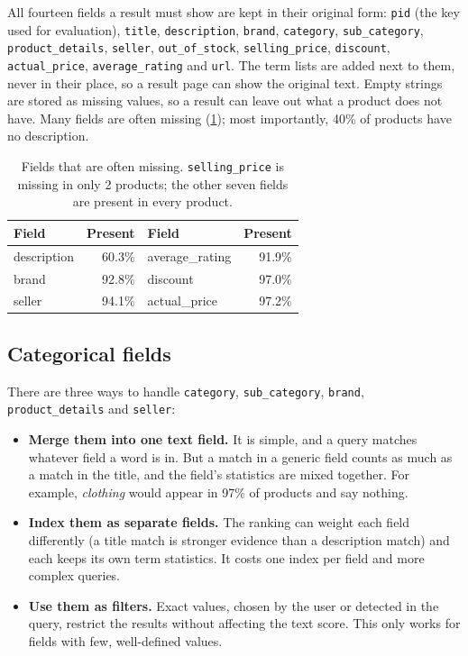 \documentclass[11pt,a4paper]{article}
\begin{document}
All fourteen fields a result must show are kept in their original form: \texttt{pid}
(the key used for evaluation), \texttt{title}, \texttt{description}, \texttt{brand},
\texttt{category}, \texttt{sub\_category}, \texttt{product\_details}, \texttt{seller},
\texttt{out\_of\_stock}, \texttt{selling\_price}, \texttt{discount},
\texttt{actual\_price}, \texttt{average\_rating} and \texttt{url}. The term lists are
added next to them, never in their place, so a result page can show the original
text. Empty strings are stored as missing values, so a result can leave out what a
product does not have. Many fields are often missing
(\cref{tab:presence}); most importantly, 40\% of products have no description.

\begin{table}[htbp]
  \centering
  \begin{tabular}{lr@{\hskip 2em}lr}
    \toprule
    Field & Present & Field & Present \\
    \midrule
    description & 60.3\% & average\_rating & 91.9\% \\
    brand & 92.8\% & discount & 97.0\% \\
    seller & 94.1\% & actual\_price & 97.2\% \\
    \bottomrule
  \end{tabular}
  \caption{Fields that are often missing. \texttt{selling\_price} is missing in only
    2 products; the other seven fields are present in every product.}
  \label{tab:presence}
\end{table}

\subsection{Categorical fields}

There are three ways to handle \texttt{category}, \texttt{sub\_category},
\texttt{brand}, \texttt{product\_details} and \texttt{seller}:

\begin{itemize}
  \item \textbf{Merge them into one text field.} It is simple, and a query matches
    whatever field a word is in. But a match in a generic field counts as much as a
    match in the title, and the field's statistics are mixed together. For example,
    \emph{clothing} would appear in 97\% of products and say nothing.
  \item \textbf{Index them as separate fields.} The ranking can weight each field
    differently (a title match is stronger evidence than a description match) and
    each keeps its own term statistics. It costs one index per field and more
    complex queries.
  \item \textbf{Use them as filters.} Exact values, chosen by the user or detected in
    the query, restrict the results without affecting the text score. This only works
    for fields with few, well-defined values.
\end{itemize}
\end{document}
